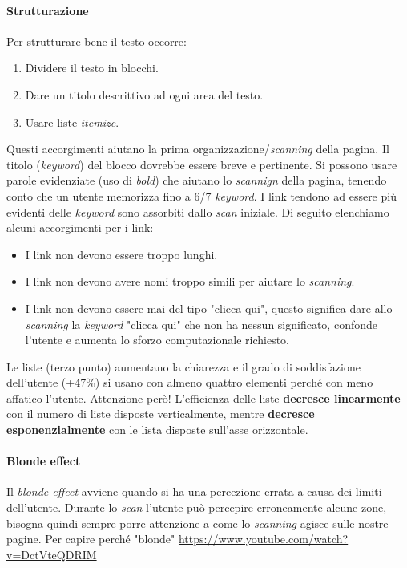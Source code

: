 			\paragraph{Strutturazione}
				Per strutturare bene il testo occorre:
				\begin{enumerate}
					\item Dividere il testo in blocchi.
					\item Dare un titolo descrittivo ad ogni area del testo.
					\item Usare liste \emph{itemize}.
				\end{enumerate}
				Questi accorgimenti aiutano la prima organizzazione/\emph{scanning} della pagina. Il titolo (\emph{keyword}) del blocco dovrebbe essere breve e pertinente. Si possono usare parole evidenziate (uso di \emph{bold}) che aiutano lo \emph{scannign} della pagina, tenendo conto che un utente memorizza fino a 6/7 \emph{keyword}.
				I link tendono ad essere più evidenti delle \emph{keyword} sono assorbiti dallo \emph{scan} iniziale. Di seguito elenchiamo alcuni accorgimenti per i link:
				\begin{itemize}
					\item I link non devono essere troppo lunghi.
					\item I link non devono avere nomi troppo simili per aiutare lo \emph{scanning}.
					\item I link non devono essere mai del tipo "clicca qui", questo significa dare allo \emph{scanning} la \emph{keyword} "clicca qui" che non ha nessun significato, confonde l'utente e aumenta lo sforzo computazionale richiesto.
				\end{itemize}
				Le liste (terzo punto) aumentano la chiarezza e il grado di soddisfazione dell'utente (+47\%) si usano con almeno quattro elementi perché con meno affatico l'utente. Attenzione però! L'efficienza delle liste \textbf{decresce linearmente} con il numero di liste disposte verticalmente, mentre \textbf{decresce esponenzialmente} con le lista disposte sull'asse orizzontale.
				
			\paragraph{Blonde effect}
				Il \emph{blonde effect} avviene quando si ha una percezione errata a causa dei limiti dell'utente. Durante lo \emph{scan} l'utente può percepire erroneamente alcune zone, bisogna quindi sempre porre attenzione a come lo \emph{scanning} agisce sulle nostre pagine.
			Per capire perché "blonde" \url{https://www.youtube.com/watch?v=DctVteQDRIM}